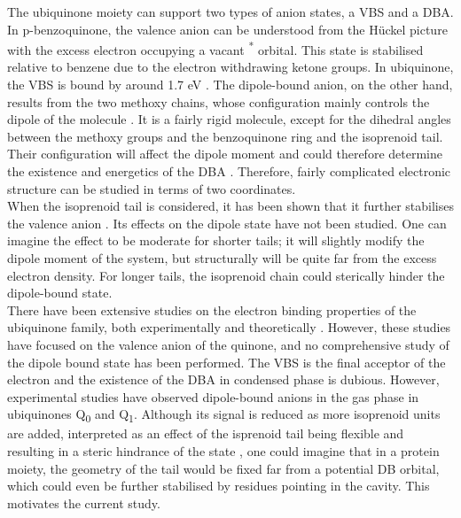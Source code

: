 The ubiquinone moiety can support two types of anion states, a VBS and a DBA. In p-benzoquinone, the valence anion can be understood from the H{\"u}ckel picture with the excess electron occupying a vacant \textpi \textsuperscript{*} orbital. This state is stabilised relative to benzene due to the electron withdrawing ketone groups. In ubiquinone, the VBS is bound by around 1.7 eV \cite{chen2024low}. The dipole-bound anion, on the other hand, results from the two methoxy chains, whose configuration mainly controls the dipole of the molecule \cite{ameixa2023parent}. It is a fairly rigid molecule, except for the dihedral angles between the methoxy groups and the benzoquinone ring and the isoprenoid tail. Their configuration will affect the dipole moment and could therefore determine the existence and energetics of the DBA \cite{ameixa2023parent,bull2015anion}. Therefore, fairly complicated electronic structure can be studied in terms of two coordinates.\\ 

When the isoprenoid tail is considered, it has been shown that it further stabilises the valence anion \cite{pshenichnyuk2020ionizing}. Its effects on the dipole state have not been studied. One can imagine the effect to be moderate for shorter tails; it will slightly modify the dipole moment of the system, but structurally will be quite far from the excess electron density. For longer tails, the isoprenoid chain could sterically hinder the dipole-bound state.\\

There have been extensive studies on the electron binding properties of the ubiquinone family, both experimentally \cite{ameixa2023parent,west2014anion,pshenichnyuk2020ionizing,bull2015anion} and theoretically \cite{ameixa2023parent,pshenichnyuk2020ionizing,haldar2020multilayer, nonella1998quantum, gamiz2017terminal}. However, these studies have focused on the valence anion of the quinone, and no comprehensive study of the dipole bound state has been performed. The VBS is the final acceptor of the electron and the existence of the DBA in condensed phase is dubious.
However, experimental studies have observed dipole-bound anions in the gas phase in ubiquinones Q\textsubscript{0} and Q\textsubscript{1}\cite{ameixa2023parent}. Although its signal is reduced as more isoprenoid units are added, interpreted as an effect of the isprenoid tail being flexible and resulting in a steric hindrance of the state \cite{ameixa2023parent,pshenichnyuk2020ionizing}, one could imagine that in a protein moiety, the geometry of the tail would be fixed far from a potential DB orbital, which could even be further stabilised by residues pointing in the cavity. This motivates the current study.\\

